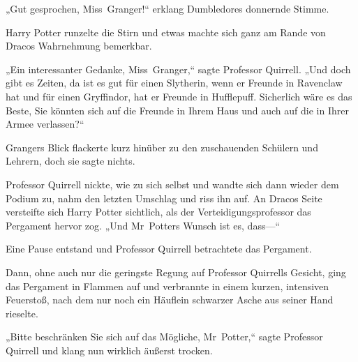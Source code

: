 „Gut gesprochen, Miss~Granger!“ erklang Dumbledores donnernde Stimme.

Harry Potter runzelte die Stirn und etwas machte sich ganz am Rande von Dracos Wahrnehmung bemerkbar.

„Ein interessanter Gedanke, Miss~Granger,“ sagte Professor Quirrell. „Und doch gibt es Zeiten, da ist es gut für einen Slytherin, wenn er Freunde in Ravenclaw hat und für einen Gryffindor, hat er Freunde in Hufflepuff. Sicherlich wäre es das Beste, Sie könnten sich auf die Freunde in Ihrem Haus und auch auf die in Ihrer Armee verlassen?“

Grangers Blick flackerte kurz hinüber zu den zuschauenden Schülern und Lehrern, doch sie sagte nichts.

Professor Quirrell nickte, wie zu sich selbst und wandte sich dann wieder dem Podium zu, nahm den letzten Umschlag und riss ihn auf. An Dracos Seite versteifte sich Harry Potter sichtlich, als der Verteidigungsprofessor das Pergament hervor zog. „Und Mr~Potters Wunsch ist es, dass—“

Eine Pause entstand und Professor Quirrell betrachtete das Pergament.

Dann, ohne auch nur die geringste Regung auf Professor Quirrells Gesicht, ging das Pergament in Flammen auf und verbrannte in einem kurzen, intensiven Feuerstoß, nach dem nur noch ein Häuflein schwarzer Asche aus seiner Hand rieselte.

„Bitte beschränken Sie sich auf das Mögliche, Mr~Potter,“ sagte Professor Quirrell und klang nun wirklich äußerst trocken.

